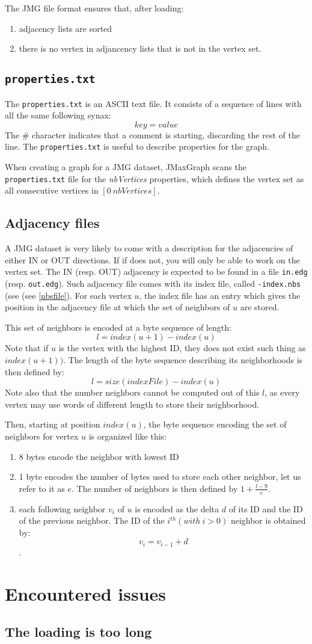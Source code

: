 \documentclass[11pt,a4paper]{article}
\begin{document}
The JMG file format ensures that, after loading:
\begin{enumerate}
\item adjacency lists are sorted
\item there is no vertex in adjancency lists that is not in the vertex set.
\end{enumerate}


\subsection{\texttt{properties.txt}}
The \texttt{properties.txt} is an ASCII text file. It consists of a sequence of lines with all the same following synax:
$$
key=value
$$
The \# character indicates that a comment is starting, discarding the rest of the line.
The \texttt{properties.txt}  is useful to describe properties for the graph.

When creating a graph for a JMG dataset, JMaxGraph scans the \texttt{properties.txt} file for the \textit{nbVertices} properties, which defines the vertex set as all consecutive vertices in $[0\  nbVertices]$.

\subsection{Adjacency files}
A JMG dataset is very likely to come with a description for the adjacencies of either IN or OUT directions. If if does not, you will only be able to work on the vertex set.
The IN (resp. OUT) adjacency is expected to be found in a file \texttt{in.edg} (resp. \texttt{out.edg}). Such adjacency file comes with its index file, called \texttt{-index.nbs} (see  (see \ref{nbsfile}).
For each vertex $u$, the index file has an entry which gives the position in the adjacency file at which the set of neighbors of $u$ are stored.

This set of neighbors is encoded at a byte sequence of length:
$$l = index(u+1) - index(u)$$
 Note that if $u$ is the vertex with the highest ID,  they does not exist such thing as $index(u+1))$. The length of the byte sequence describing its neighborhoods is then defined by:
 $$l = size(indexFile) - index(u)$$
Note also that the number neighbors cannot be computed out of this $l$, as every vertex may use words of different length to store their neighborhood.

Then, starting at position $index(u)$, the byte sequence encoding the set of neighbors for vertex $u$ is organized like this:
\begin{enumerate}
\item 8 bytes encode the neighbor with lowest ID
\item 1 byte encodes the number of bytes used to store each other neighbor, let us refer to it as $e$. The number of neighbors is then defined by $1 + \frac{l - 9}{e}$.
\item each following neighbor $v_i$ of $u$ is encoded as the delta $d$ of its ID and the ID of the previous neighbor.
The ID of the $i^{th} (with\ i > 0)$ neighbor is obtained by:
$$v_i = v_{i-1} + d$$.
\end{enumerate}

\section{Encountered issues}
\subsection{The loading is too long}
\end{document}
